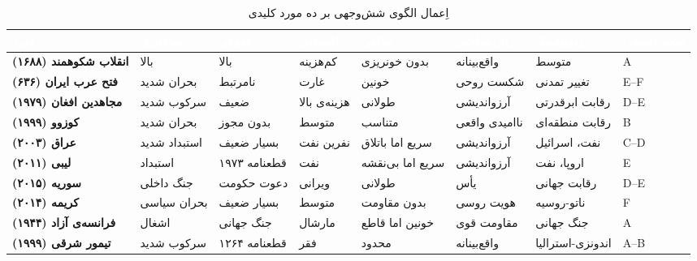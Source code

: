 \begin{landscape}
\begin{table}[htbp]
\centering
\caption{اِعمال الگوی شش‌وجهی بر ده مورد کلیدی}\label{tab:ch03-comparative}
\begin{adjustbox}{max width=\linewidth}
\begin{tabular}{
  >{\raggedleft\arraybackslash\bfseries\small}p{2cm}
  >{\raggedleft\arraybackslash\small}p{1.5cm}
  >{\raggedleft\arraybackslash\small}p{1.5cm}
  >{\raggedleft\arraybackslash\small}p{1.5cm}
  >{\raggedleft\arraybackslash\small}p{1.5cm}
  >{\raggedleft\arraybackslash\small}p{1.5cm}
  >{\raggedleft\arraybackslash\small}p{1.5cm}
  >{\raggedleft\arraybackslash\small}p{2cm}}
\toprule
\rowcolor{PrimaryDeep}
\textcolor{white}{مورد} &
\textcolor{white}{ساختاری} &
\textcolor{white}{حقوقی} &
\textcolor{white}{اقتصادی} &
\textcolor{white}{نظامی} &
\textcolor{white}{روان‌شناختی} &
\textcolor{white}{ژئوپولیتیک} &
\textcolor{white}{نتیجه (طیف)} \\
\midrule

انقلاب شکوهمند (۱۶۸۸) &
\cellcolor{AccentGreen!20}بالا &
\cellcolor{AccentGreen!20}بالا &
\cellcolor{AccentGreen!20}کم‌هزینه &
\cellcolor{AccentGreen!20}بدون خونریزی &
\cellcolor{AccentGreen!20}واقع‌بینانه &
\cellcolor{mixed mark!20}متوسط &
\cellcolor{AccentGreen!20}A \\
\rowcolor{NeutralLight}
فتح عرب ایران (۶۳۶) &
بحران شدید &
نامرتبط &
غارت &
خونین &
شکست روحی &
تغییر تمدنی &
E–F \\
مجاهدین افغان (۱۹۷۹) &
سرکوب شدید &
ضعیف &
هزینه‌ی بالا &
طولانی &
آرزواندیشی &
رقابت ابرقدرتی &
D–E \\
\rowcolor{NeutralLight}
کوزوو (۱۹۹۹) &
بحران شدید &
بدون مجوز &
متوسط &
متناسب &
ناامیدی واقعی &
رقابت منطقه‌ای &
B \\
عراق (۲۰۰۳) &
استبداد شدید &
بسیار ضعیف &
نفرین نفت &
سریع اما باتلاق &
آرزواندیشی &
نفت، اسرائیل &
C–D \\
\rowcolor{NeutralLight}
لیبی (۲۰۱۱) &
استبداد &
قطعنامه ۱۹۷۳ &
نفت &
سریع اما بی‌نقشه &
آرزواندیشی &
اروپا، نفت &
E \\
سوریه (۲۰۱۵) &
جنگ داخلی &
دعوت حکومت &
ویرانی &
طولانی &
یأس &
رقابت جهانی &
D–E \\
\rowcolor{NeutralLight}
کریمه (۲۰۱۴) &
بحران سیاسی &
بسیار ضعیف &
متوسط &
بدون مقاومت &
هویت روسی &
ناتو-روسیه &
F \\
فرانسه‌ی آزاد (۱۹۴۴) &
اشغال &
جنگ جهانی &
مارشال &
خونین اما قاطع &
مقاومت قوی &
جنگ جهانی &
A \\
\rowcolor{NeutralLight}
تیمور شرقی (۱۹۹۹) &
سرکوب شدید &
قطعنامه ۱۲۶۴ &
فقر &
محدود &
واقع‌بینانه &
اندونزی-استرالیا &
A–B \\

\bottomrule
\end{tabular}
\end{adjustbox}
\end{table}
\end{landscape}

